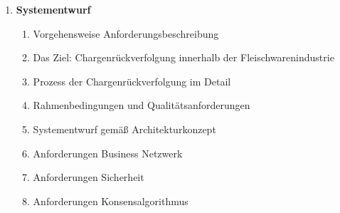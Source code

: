 \begin{small}
\begin{enumerate}
\begin{enumerate}[label*=\arabic*.]
    \end{enumerate}
    \item \textbf{Systementwurf}
    \begin{enumerate}[label*=\arabic*.]
      \item Vorgehensweise Anforderungsbeschreibung
      \item Das Ziel: Chargenrückverfolgung innerhalb der Fleischwarenindustrie
      \item Prozess der Chargenrückverfolgung im Detail
      \item Rahmenbedingungen und Qualitätsanforderungen
      \item Systementwurf gemäß Architekturkonzept
      \item Anforderungen Business Netzwerk
      \item Anforderungen Sicherheit
      \item Anforderungen Konsensalgorithmus

\end{enumerate}
\end{enumerate}
\end{small}
